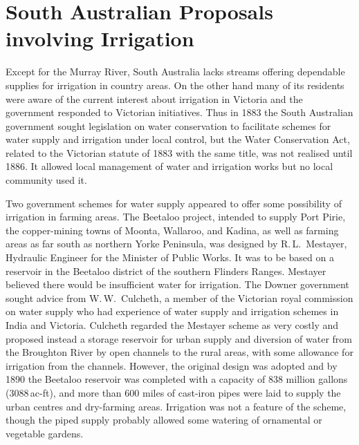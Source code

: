 \section*{South Australian Proposals involving Irrigation}

Except for the Murray River, South Australia lacks streams offering
dependable supplies for irrigation in country areas.  On the other
hand many of its residents were aware of the current interest about
irrigation in Victoria and the government responded to Victorian
initiatives.  Thus in 1883 the South Australian government sought
legislation on water conservation to facilitate schemes for water
supply and irrigation under local control, but the Water Conservation
Act, related to the Victorian statute of 1883 with the same title, was
not realised until 1886.  It allowed local management of water and
irrigation works but no local community used it.

Two government schemes for water supply appeared to offer some
possibility of irrigation in farming areas.  The Beetaloo project,
intended to supply Port Pirie, the copper-mining towns of Moonta,
Wallaroo, and Kadina, as well as farming areas as far south as
northern Yorke Peninsula, was designed by R.\,L.~Mestayer, Hydraulic
Engineer for the Minister of Public Works.
It was to be based on a reservoir in the Beetaloo district of the
southern Flinders Ranges.  Mestayer believed there would be
insufficient water for irrigation.  The Downer government sought
advice from W.\,W.~Culcheth, a member of the Victorian royal
commission on water supply who had experience of water supply and
irrigation schemes in India and Victoria.  Culcheth regarded the
Mestayer scheme as very costly and proposed instead a storage
reservoir for urban supply and diversion of water from the Broughton
River by open channels to the rural areas, with some allowance for
irrigation from the channels.  However, the
original design was adopted and by 1890 the Beetaloo reservoir was
completed with a capacity of 838 million gallons (3088\,ac-ft), and
more than 600 miles of cast-iron pipes were laid to supply the urban
centres and dry-farming areas.  Irrigation was not a feature of the
scheme, though the piped supply probably allowed some watering of
ornamental or vegetable gardens.

